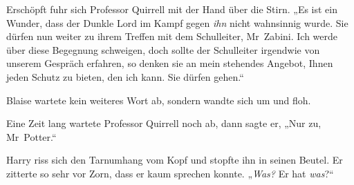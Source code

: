 Erschöpft fuhr sich Professor Quirrell mit der Hand über die Stirn.
„Es ist ein Wunder, dass der Dunkle Lord im Kampf gegen \emph{ihn} nicht wahnsinnig wurde. Sie dürfen nun weiter zu ihrem Treffen mit dem Schulleiter, Mr~Zabini. Ich werde über diese Begegnung schweigen, doch sollte der Schulleiter irgendwie von unserem Gespräch erfahren, so denken sie an mein stehendes Angebot, Ihnen jeden Schutz zu bieten, den ich kann. Sie dürfen gehen.“

Blaise wartete kein weiteres Wort ab, sondern wandte sich um und floh.

\later

Eine Zeit lang wartete Professor Quirrell noch ab, dann sagte er,
„Nur zu, Mr~Potter.“

Harry riss sich den Tarnumhang vom Kopf und stopfte ihn in seinen Beutel. Er zitterte so sehr vor Zorn, dass er kaum sprechen konnte.
„\emph{Was?} Er hat \emph{was}?“

